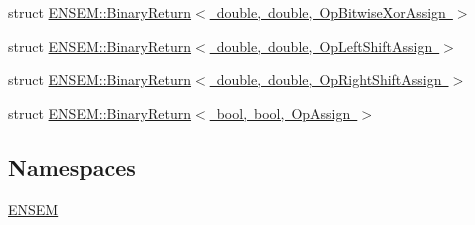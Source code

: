 \begin{DoxyCompactItemize}
\item 
struct \mbox{\hyperlink{structENSEM_1_1BinaryReturn_3_01double_00_01double_00_01OpBitwiseXorAssign_01_4}{E\+N\+S\+E\+M\+::\+Binary\+Return$<$ double, double, Op\+Bitwise\+Xor\+Assign $>$}}
\item 
struct \mbox{\hyperlink{structENSEM_1_1BinaryReturn_3_01double_00_01double_00_01OpLeftShiftAssign_01_4}{E\+N\+S\+E\+M\+::\+Binary\+Return$<$ double, double, Op\+Left\+Shift\+Assign $>$}}
\item 
struct \mbox{\hyperlink{structENSEM_1_1BinaryReturn_3_01double_00_01double_00_01OpRightShiftAssign_01_4}{E\+N\+S\+E\+M\+::\+Binary\+Return$<$ double, double, Op\+Right\+Shift\+Assign $>$}}
\item 
struct \mbox{\hyperlink{structENSEM_1_1BinaryReturn_3_01bool_00_01bool_00_01OpAssign_01_4}{E\+N\+S\+E\+M\+::\+Binary\+Return$<$ bool, bool, Op\+Assign $>$}}
\end{DoxyCompactItemize}
\subsection*{Namespaces}
\begin{DoxyCompactItemize}
\item 
 \mbox{\hyperlink{namespaceENSEM}{E\+N\+S\+EM}}
\end{DoxyCompactItemize}
